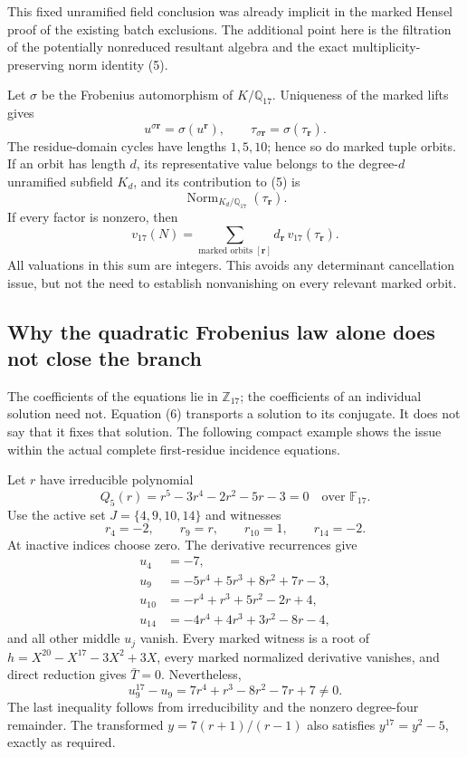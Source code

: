 \documentclass[
  british,
  10pt,
]{article}
\begin{document}
This fixed unramified field conclusion was already implicit in the
marked Hensel proof of the existing batch exclusions. The additional
point here is the filtration of the potentially nonreduced resultant
algebra and the exact multiplicity-preserving norm identity (5).

Let \(\sigma\) be the Frobenius automorphism of \(K/\mathbb Q_{17}\).
Uniqueness of the marked lifts gives \[
u^{\sigma\mathbf r}=\sigma(u^{\mathbf r}),\qquad
\tau_{\sigma\mathbf r}=\sigma(\tau_{\mathbf r}).
\tag{6}
\] The residue-domain cycles have lengths \(1,5,10\); hence so do marked
tuple orbits. If an orbit has length \(d\), its representative value
belongs to the degree-\(d\) unramified subfield \(K_d\), and its
contribution to (5) is \[
\operatorname{Norm}_{K_d/\mathbb Q_{17}}(\tau_{\mathbf r}).
\] If every factor is nonzero, then \[
v_{17}(N)=\sum_{\text{marked orbits }[\mathbf r]}
 d_{\mathbf r}\,v_{17}(\tau_{\mathbf r}).
\tag{7}
\] All valuations in this sum are integers. This avoids any determinant
cancellation issue, but not the need to establish nonvanishing on every
relevant marked orbit.

\subsection{Why the quadratic Frobenius law alone does not close the
branch}\label{why-the-quadratic-frobenius-law-alone-does-not-close-the-branch}

The coefficients of the equations lie in \(\mathbb Z_{17}\); the
coefficients of an individual solution need not. Equation (6) transports
a solution to its conjugate. It does not say that it fixes that
solution. The following compact example shows the issue within the
actual complete first-residue incidence equations.

Let \(r\) have irreducible polynomial \[
Q_5(r)=r^5-3r^4-2r^2-5r-3=0
\quad\text{over }\mathbb F_{17}.
\] Use the active set \(J=\{4,9,10,14\}\) and witnesses \[
r_4=-2,\qquad r_9=r,\qquad r_{10}=1,\qquad r_{14}=-2.
\] At inactive indices choose zero. The derivative recurrences give \[
\begin{aligned}
u_4&=-7,\\
u_9&=-5r^4+5r^3+8r^2+7r-3,\\
u_{10}&=-r^4+r^3+5r^2-2r+4,\\
u_{14}&=-4r^4+4r^3+3r^2-8r-4,
\end{aligned}
\] and all other middle \(u_j\) vanish. Every marked witness is a root
of \(h=X^{20}-X^{17}-3X^2+3X\), every marked normalized derivative
vanishes, and direct reduction gives \(\bar T=0\). Nevertheless, \[
u_9^{17}-u_9
=7r^4+r^3-8r^2-7r+7\ne0.
\tag{8}
\] The last inequality follows from irreducibility and the nonzero
degree-four remainder. The transformed \(y=7(r+1)/(r-1)\) also satisfies
\(y^{17}=y^2-5\), exactly as required.
\end{document}
